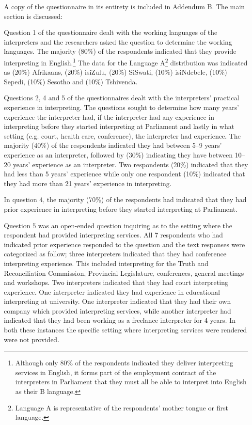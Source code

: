 \documentclass[output=paper]{langsci/langscibook}
\begin{document}
A copy of the questionnaire in its entirety is included in Addendum B. The main section is discussed:

Question 1 of the questionnaire dealt with the working languages of the interpreters and the researchers asked the question to determine the working languages. The majority (80\%) of the respondents indicated that they provide interpreting in English.\footnote{Although only 80\% of the respondents indicated they deliver interpreting services in English, it forms part of the employment contract of the interpreters in Parliament that they must all be able to interpret into English as their B language.} The data for the Language A\footnote{Language A is representative of the respondents’ mother tongue or first language.}  distribution was indicated as (20\%) Afrikaans, (20\%) isiZulu, (20\%) SiSwati, (10\%) isiNdebele, (10\%) Sepedi, (10\%) Sesotho and (10\%) Tshivenda. 

Questions 2, 4 and 5 of the questionnaires dealt with the interpreters’ practical experience in interpreting. The questions sought to determine how many years’ experience the interpreter had, if the interpreter had any experience in interpreting before they started interpreting at Parliament and lastly in what setting (e.g. court, health care, conference), the interpreter had experience. The majority (40\%) of the respondents indicated they had between 5--9 years’ experience as an interpreter, followed by (30\%) indicating they have between 10--20 years’ experience as an interpreter. Two respondents (20\%) indicated that they had less than 5 years’ experience while only one respondent (10\%) indicated that they had more than 21 years’ experience in interpreting.  

In question 4, the majority (70\%) of the respondents had indicated that they had prior experience in interpreting before they started interpreting at Parliament.  

Question 5 was an open-ended question inquiring as to the setting where the respondent had provided interpreting services. All 7 respondents who had indicated prior experience responded to the question and the text responses were categorized as follow; three interpreters indicated that they had conference interpreting experience. This included interpreting for the Truth and Reconciliation Commission, Provincial Legislature, conferences, general meetings and workshops. Two interpreters indicated that they had court interpreting experience. One interpreter indicated they had experience in educational interpreting at university. One interpreter indicated that they had their own company which provided interpreting services, while another interpreter had indicated that they had been working as a freelance interpreter for 4 years. In both these instances the specific setting where interpreting services were rendered were not provided. 
\end{document}
